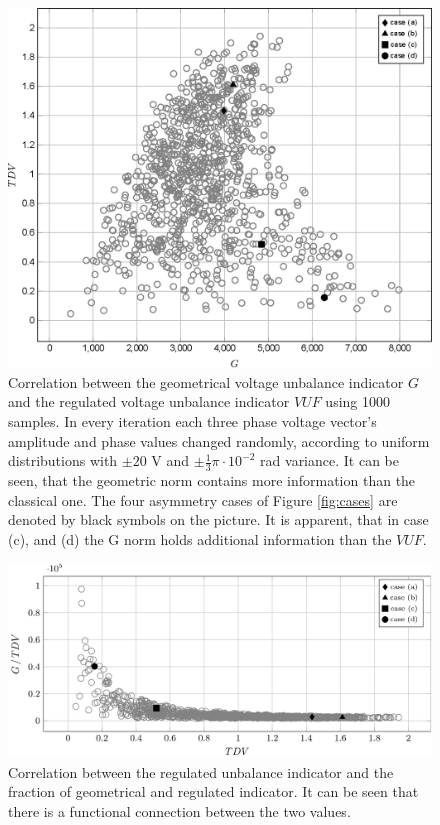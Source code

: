             \begin{figure}[!ht]
           \centering
           \includegraphics[width=\textwidth,scale=0.95]{Unblance_EPS_Pics/EPS_images/scatter.eps}
           \caption{Correlation between the geometrical voltage unbalance indicator $G$ and the regulated voltage unbalance indicator $VUF$ using 1000 samples. In every iteration each three phase voltage vector's amplitude and phase values changed randomly, according to uniform distributions with $\pm20$ V and $\pm\frac{1}{3}\pi\cdot10^{-2}$ rad variance. It can be seen, that the geometric norm contains more information than the classical one. The  four asymmetry cases of Figure \ref{fig:cases} are denoted by black symbols on the picture. It is apparent, that in case (c), and (d) the G norm holds additional information than the $VUF$.}
           \label{fig:correlation}
            \end{figure}

            \begin{figure}[!ht]
           \centering
           \includegraphics[width=\textwidth,scale=0.95]{Unblance_EPS_Pics/EPS_images/side_scatter.eps}
           \caption{ Correlation between the regulated unbalance indicator and the fraction of geometrical and regulated indicator. It can be seen that there is a functional connection between the two values.}
           \label{fig:side_correlation}
            \end{figure}


